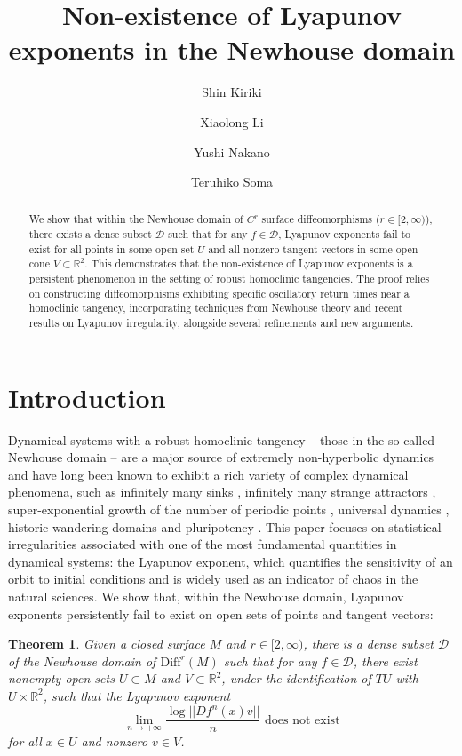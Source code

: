 \documentclass{amsart}
\title[Non-existence of Lyapunov exponents in the Newhouse domain]{Non-existence of Lyapunov exponents in the Newhouse domain}
\author{Shin Kiriki}
\author{Xiaolong Li}
\author{Yushi Nakano}
\author{Teruhiko Soma}
\newtheorem{main}{Theorem}
\theoremstyle{plain}
\theoremstyle{definition}
\theoremstyle{remark}
\numberwithin{equation}{section}
\begin{document}
\begin{abstract}
We show that within the Newhouse domain of $C^r$ surface diffeomorphisms ($r \in [2,\infty )$), there exists a dense subset $\mathcal{D}$ such that for any $f \in \mathcal{D}$, Lyapunov exponents fail to exist for all points in some open set $U$ and all nonzero tangent vectors in some open cone $V \subset \mathbb{R}^2$.
This demonstrates that the non-existence of Lyapunov exponents is a persistent phenomenon in the setting of robust homoclinic tangencies.
The proof relies on constructing diffeomorphisms exhibiting specific oscillatory return times near a homoclinic tangency, incorporating techniques from Newhouse theory and recent results on Lyapunov irregularity, alongside several refinements and new arguments.
\end{abstract}



\maketitle



\section{Introduction}

Dynamical systems with a robust homoclinic tangency -- those in the so-called Newhouse domain -- are a major source of extremely non-hyperbolic dynamics and have long been known to exhibit a rich variety of complex dynamical phenomena, 
such as infinitely many sinks \cite{N1974}, infinitely many strange attractors \cite{Colli1998}, super-exponential growth of the number of periodic points \cite{Kaloshin2000}, universal dynamics \cite{Turaev2015}, historic wandering domains \cite{KS2017,KNS2022} and pluripotency \cite{KLNSV2025}.
This paper focuses on statistical irregularities associated with one of the most fundamental quantities in dynamical systems: the Lyapunov exponent, which quantifies the sensitivity of an orbit to initial conditions and is widely used as an indicator of chaos in the natural sciences.
We show that, within the Newhouse domain, Lyapunov exponents persistently fail to exist on open sets of points and tangent vectors:

\begin{main}\label{thm:main}
Given a closed surface $M$ and $r\in [2,\infty )$, there is a dense subset $\mathcal D$ of the Newhouse domain of 
$\mathrm{Diff}^r(M)$ 
such that for any $f\in \mathcal D$, there exist nonempty open sets $U\subset M$ and  $V\subset \mathbb R^2$, under the identification of $TU$ with $U \times \mathbb R^2$, such that the Lyapunov exponent
\[
\text{$\displaystyle \lim_{n\to+\infty} \frac{\log ||Df^n(x)v||}{n}$ does not exist}
\]
for all $x\in U$ and nonzero $v\in V$.
\end{main}
\end{document}
